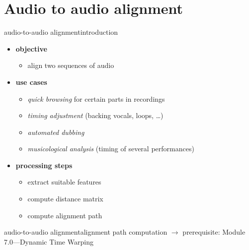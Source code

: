     \section[A2A]{Audio to audio alignment}
        \begin{frame}{audio-to-audio alignment}{introduction}
            \begin{itemize}
                \item	\textbf{objective}
                    \begin{itemize}
                        \item	align two sequences of audio
                    \end{itemize}
                \bigskip
                \item<2->	\textbf{use cases}
                    \begin{itemize}
                        \item	\textit{quick browsing} for certain parts in recordings
                        \item	\textit{timing adjustment} (backing vocals, loops, \ldots)
                        \item	\textit{automated dubbing}
                        \item	\textit{musicological analysis} (timing of several performances)
                    \end{itemize}
                \bigskip
                \item<3->	\textbf{processing steps}
                    \begin{itemize}
                        \item	extract suitable features
                        \item	compute distance matrix
                        \item	compute alignment path
                    \end{itemize}
            \end{itemize}
        \end{frame}

        \begin{frame}{audio-to-audio alignment}{alignment path computation}
            \vspace{-2mm}
            $\rightarrow$ prerequisite: Module 7.0---Dynamic Time Warping
            \vspace{-3mm}
        \end{frame}

